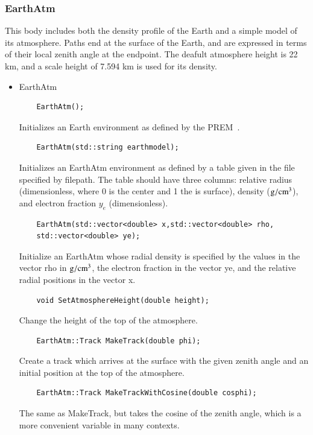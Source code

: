 \documentclass[3p,12pt]{elsarticle}
\newcommand{\ttf}{\ttfamily}
\begin{document}
\subsubsection{EarthAtm\label{sec:earthatm}}
This body includes both the density profile of the Earth and a simple model of its atmosphere. 
Paths end at the surface of the Earth, and are expressed in terms of their local zenith angle at the endpoint. 
The deafult atmosphere height is 22 km, and a scale height of 7.594 km is used for its density. 
\begin{itemize}
\item {\ttf EarthAtm}
  \begin{lstlisting}
    EarthAtm();
  \end{lstlisting}
  Initializes an {\ttf Earth} environment as defined by the PREM~\citep{dziewonski1981preliminary}.
  \begin{lstlisting}
    EarthAtm(std::string earthmodel);
  \end{lstlisting}
  Initializes an {\ttf EarthAtm} environment as defined by a table given in the file specified by {\ttf filepath}. The table should have three columns: relative radius (dimensionless, where 0 is the center and 1 the is surface), density (${\rm g}/{\rm cm}^3$), and electron fraction $y_e$ (dimensionless). 
  \begin{lstlisting}
    EarthAtm(std::vector<double> x,std::vector<double> rho,
    std::vector<double> ye);
  \end{lstlisting}
  Initialize an {\ttf EarthAtm} whose radial density is specified by the
  values in the vector {\ttf rho} in ${\rm g}/{\rm cm}^3$, the
  electron fraction in the vector {\ttf ye}, and the relative radial positions
  in the vector {\ttf x}. 
  \begin{lstlisting}
    void SetAtmosphereHeight(double height);
  \end{lstlisting}
  Change the height of the top of the atmosphere. 
  \begin{lstlisting}
    EarthAtm::Track MakeTrack(double phi);
  \end{lstlisting}
  Create a track which arrives at the surface with the given zenith angle and an initial position at the top of the atmosphere.
  \begin{lstlisting}
    EarthAtm::Track MakeTrackWithCosine(double cosphi);
  \end{lstlisting}
  The same as {\ttf MakeTrack}, but takes the cosine of the zenith angle, which is a more convenient variable in many contexts.


\end{itemize}
\end{document}
